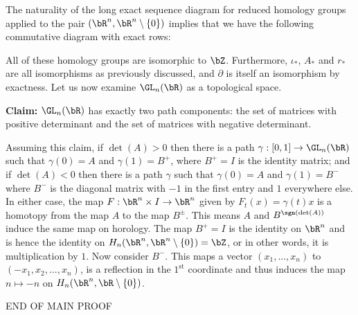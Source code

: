 \begin{homework}[e]
\begin{prf}
    The naturality of the long exact sequence diagram for reduced homology groups applied to the pair $(\bR^n,\bR^n\setminus \{0\})$ implies that we have the following commutative diagram with exact rows:
    \begin{center}
    \end{center}
    All of these homology groups are isomorphic to $\bZ$. Furthermore, $\iota_*$, $A_*$ and $r_*$ are all isomorphisms as previously discussed, and $\partial$ is itself an isomorphism by exactness. Let us now examine $\GL_n(\bR)$ as a topological space. 
  \begin{center}
      \textbf{Claim:} $\GL_n(\bR)$ has exactly two path components: the set of matrices with positive determinant and the set of matrices with negative determinant.
  \end{center}
  Assuming this claim, if $\det(A) > 0$ then there is a path $\gamma:[0,1]\to \GL_n(\bR)$ such that $\gamma(0) = A$ and $\gamma(1) = B^+$, where $B^+ = I$ is the identity matrix; and if $\det(A) < 0$ then there is a path $\gamma$ such that $\gamma(0) = A$ and $\gamma(1) = B^-$ where $B^-$ is the diagonal matrix with $-1$ in the first entry and $1$ everywhere else. In either case, the map $F:\bR^n\times I\to \bR^n$ given by $F_t(x) = \gamma(t)x$ is a homotopy from the map $A$ to the map $B^{\pm}$. This means $A$ and $B^{\sgn(\det(A))}$ induce the same map on horology. The map $B^+ = I$ is the identity on $\bR^n$ and is hence the identity on $H_n(\bR^n,\bR^n\setminus \{0\}) = \bZ$, or in other words, it is multiplication by $1$. Now consider $B^-$. This maps a vector $(x_1,...,x_n)$ to $(-x_1,x_2,...,x_n)$, is a reflection in the $1^{\text{st}}$ coordinate and thus induces the map $n\mapsto -n$ on $H_n(\bR^n,\bR\setminus \{0\})$.

  \begin{center}
    END OF MAIN PROOF
  \end{center}


\end{prf}
\end{homework}
